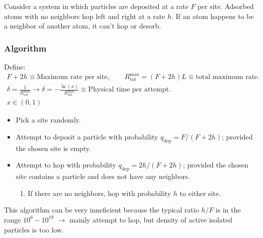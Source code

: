 \documentclass[letterpaper]{article}
\begin{document}
    Consider a system in which particles are deposited at a rate $F$ per site.
    Adsorbed atoms with no neighbors hop left and right at a rate $h$. If
    an atom happens to be a neighbor of another atom, it can't hop or desorb.
    
    \subsubsection{Algorithm}
    Define:
    \begin{gather*}
        F+2h\equiv\text{Maximum rate per site},\qquad
        R_{\text{tot}}^{\text{max}}=\left(F+2h\right)L\equiv\text{total
        maximum rate.}\\
        \delta = \frac{1}{R_{\text{tot}}^{\text{max}}}\rightarrow
        \delta = -\frac{\ln\left(x\right)}{R_{\text{tot}}^{\text{max}}}\equiv
        \text{{Physical time per attempt.}}\\
        x\in\left(0,1\right)
    \end{gather*}
    \begin{itemize}
        \item Pick a site randomly.
        \item Attempt to deposit a particle with probability
        $q_\text{dep}=F/\left(F+2h\right)$; provided the chosen site
        is empty.
        \item Attempt to hop with probability
        $q_\text{dep}=2h/\left(F+2h\right)$; provided the chosen site
        contains a particle and does not have any neighbors.
        \begin{enumerate}
            \item If there are no neighbors, hop with probability 
            $h$ to either site.
        \end{enumerate}
    \end{itemize}
    This algorithm can be very inneficient because the typical ratio
    $h/F$ is in the range $10^{6} - 10^{19}$ $\rightarrow$ mainly attempt to
    hop, but density of active isolated particles is too low.
    \begin{center}
    \end{center}
\end{document}
